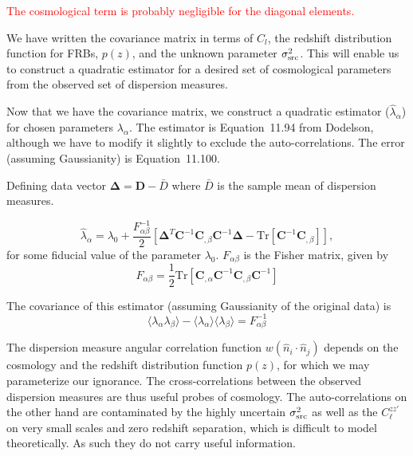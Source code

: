 \documentclass[twocolumn,prd,noshowpacs,nofootinbib,amsmath,amssymb]{revtex4}
\newcommand{\bD}{\boldsymbol D}
\newcommand{\bC}{\boldsymbol C}
\newcommand{\bDelta}{\boldsymbol \Delta}
\newcommand{\red}{\textcolor{red}}
\begin{document}
\red{The cosmological term is probably negligible for the diagonal elements.}

We have written the covariance matrix in terms of $C_l$, the
redshift distribution function for FRBs, $p(z)$, and the unknown parameter
$\sigma^2_{\rm src}$.  This will enable us to construct a quadratic estimator
for a desired set of cosmological parameters from the observed set of
dispersion measures.

Now that we have the covariance matrix, we construct a quadratic estimator
($\hat{\lambda}_\alpha$) for
chosen parameters $\lambda_\alpha$. The estimator is Equation~11.94 from
Dodelson, although we have to modify it slightly to exclude the
auto-correlations.  The error (assuming Gaussianity) is Equation~11.100.

Defining data vector $\bDelta = \bD - \bar{D}$ where $\bar{D}$ is the sample
mean of dispersion measures.

\begin{equation}
    \label{e:est_dod}
    \hat{\lambda}_\alpha = \lambda_0
        + \frac{F^{-1}_{\alpha\beta}}{2} 
        \left[ \bDelta^T \bC^{-1} \bC_{,\beta} \bC^{-1} \bDelta
        - \mathrm{Tr}\left[\bC^{-1} \bC_{,\beta}\right] \right],
\end{equation}
for some fiducial value of the parameter $\lambda_0$.  $F_{\alpha\beta}$ is the
Fisher matrix, given by
\begin{equation}
    F_{\alpha \beta} = \frac{1}{2} \mathrm{Tr} 
        \left[ \bC_{,\alpha} \bC^{-1} \bC_{,\beta} \bC^{-1} \right]
\end{equation}

The covariance of this estimator (assuming Gaussianity of the original
data) is
\begin{equation}
    \langle \lambda_\alpha \lambda_\beta \rangle
        - \langle \lambda_\alpha \rangle \langle \lambda_\beta \rangle
        = F^{-1}_{\alpha\beta}
\end{equation}

The dispersion measure angular correlation function 
$w(\hat{n}_i\cdot\hat{n}_j)$ depends on the cosmology
and the redshift distribution function $p(z)$, for which we may parameterize
our ignorance. The
cross-correlations between the observed dispersion measures are thus useful
probes of cosmology.  The auto-correlations on the other hand are contaminated
by the highly uncertain $\sigma^2_{\rm src}$ as well as the $C^{zz'}_\ell$ on
very small scales and zero redshift separation, which is difficult to model
theoretically.  As such they do not carry useful information.
\end{document}
